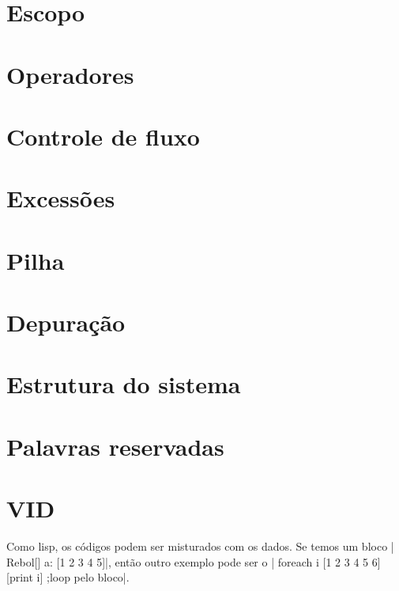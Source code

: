 \documentclass[12pt]{article}
\begin{document}
\section{Escopo}
\section{Operadores}
\section{Controle de fluxo}
\section{Excessões}
\section{Pilha}
\section{Depuração}
\section{Estrutura do sistema}
\section{Palavras reservadas}
\section{VID}





Como lisp, os códigos podem ser misturados com os dados. Se
temos um bloco | Rebol[] a: [1 2 3 4 5]|, então outro exemplo pode
ser o |
foreach i [1 2 3 4 5 6] [print i] ;loop pelo bloco|.
\end{document}
